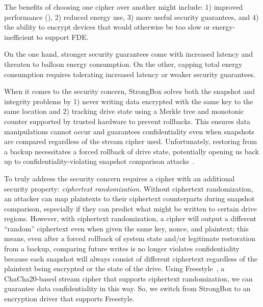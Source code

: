 
The benefits of choosing one cipher over another might include: 1)
improved performance (), 2) reduced energy
use, 3) more useful security guarantees, and 4) the ability to encrypt devices
that would otherwise be too slow or energy-inefficient to support FDE.






On the one hand, stronger
security guarantees come with increased latency and threaten to balloon energy
consumption. On the other, capping total energy consumption requires tolerating
increased latency or weaker security guarantees.





When it comes to the security concern, StrongBox solves both the snapshot and
integrity problems by 1) never writing data encrypted with the same key to the
same location and 2) tracking drive state using a Merkle tree and monotonic
counter supported by trusted hardware to prevent rollbacks. This ensures data
manipulations cannot occur and guarantees confidentiality even when snapshots
are compared regardless of the stream cipher used. Unfortunately, restoring from
a backup necessitates a forced rollback of drive state, potentially opening us
back up to confidentiality-violating snapshot comparison
attacks~\cite{StrongBox}.



To truly address the security concern requires a cipher with an additional
security property: \emph{ciphertext randomization}. Without ciphertext
randomization, an attacker can map plaintexts to their ciphertext counterparts
during snapshot comparison, especially if they can predict what might be written
to certain drive regions. However, with ciphertext randomization, a cipher will
output a different ``random'' ciphertext even when given the same key, nonce,
and plaintext; this means, even after a forced rollback of system state and/or
legitimate restoration from a backup, comparing future writes is no longer
violates confidentiality because each snapshot will always consist of different
ciphertext regardless of the plaintext being encrypted or the state of the
drive. Using Freestyle~\cite{Freestyle}, a ChaCha20-based stream cipher that
supports ciphertext randomization, we can guarantee data confidentiality in this
way. So, we switch from StrongBox to an encryption driver that supports
Freestyle.

